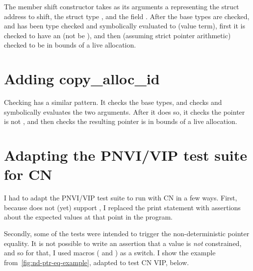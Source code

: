 
The member shift constructor takes as its arguments a 
representing the struct address to shift, the struct type ,
and the field . After the base types are checked, and
 has been type checked and symbolically evaluated to
 (value term), first it is checked to have an 
(not be ), and then (assuming strict pointer arithmetic) checked to
be in bounds of a live allocation.



\section{Adding copy\_alloc\_id}

Checking  has a similar pattern. It checks the base
types, and checks and symbolically evaluates the two arguments. After it does so,
it checks the pointer is not , and then checks the resulting
pointer is in bounds of a live allocation.


\section{Adapting the PNVI/VIP test suite for CN}

I had to adapt the PNVI/VIP test suite to run with CN in a few ways. First,
because  does not (yet) support , I replaced the print
statement with assertions about the expected values at that point in the
program.

Secondly, some of the tests were intended to trigger the non-deterministic
pointer equality. It is not possible to write an assertion that a value
is \emph{not} constrained, and so for that, I used macros
( and ) as a switch. I show the
example from~\cref{fig:nd-ptr-eq-example}, adapted to test CN VIP, below.

